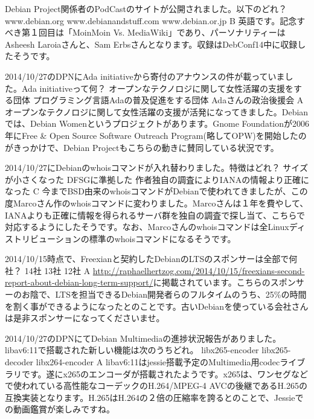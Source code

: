 %

\santaku
{Debian Project関係者のPodCastのサイトが公開されました。以下のどれ？}
{www.debian.org}
{www.debianandstuff.com}
{www.debian.or.jp}
{B}
{英語です。記念すべき第１回目は「MoinMoin Vs. MediaWiki」であり、パーソナリティーはAsheesh Laroiaさんと、Sam Erbsさんとなります。収録はDebConf14中に収録したそうです。}

\santaku
{2014/10/27のDPNにAda initiativeから寄付のアナウンスの件が載っていました。Ada initiativeって何？}
{オープンなテクノロジに関して女性活躍の支援をする団体}
{プログラミング言語Adaの普及促進をする団体}
{Adaさんの政治後援会}
{A}
{オープンなテクノロジに関して女性活躍の支援が活発になってきました。Debianでは、Debian Womenというプロジェクトがあります。Gnome Foundationが2006年にFree \& Open Source Software Outreach Program(略してOPW)を開始したのがきっかけで、Debian Projectもこちらの動きに賛同している状況です。}

\santaku
{2014/10/27にDebianのwhoisコマンドが入れ替わりました。特徴はどれ？}
{サイズが小さくなった}
{DFSGに準拠した}
{作者独自の調査によりIANAの情報より正確になった}
{C}
{今までBSD由来のwhoisコマンドがDebianで使われてきましたが、この度Marcoさん作のwhoisコマンドに変わりました。Marcoさんは１年を費やして、IANAよりも正確に情報を得られるサーバ群を独自の調査で探し当て、こちらで対応するようにしたそうです。なお、Marcoさんのwhoisコマンドは全Linuxディストリビューションの標準のwhoisコマンドになるそうです。}

\santaku
{2014/10/15時点で、Freexianと契約したDebianのLTSのスポンサーは全部で何社？}
{14社}
{13社}
{12社}
{A}
{\url{http://raphaelhertzog.com/2014/10/15/freexians-second-report-about-debian-long-term-support/}に掲載されています。こちらのスポンサーのお陰で、LTSを担当できるDebian開発者らのフルタイムのうち、25\%の時間を割く事ができるようになったとのことです。古いDebianを使っている会社さんは是非スポンサーになってくださいませ。}

\santaku
{2014/10/27のDPNにてDebian Multimediaの進捗状況報告がありました。libav6:11で搭載された新しい機能は次のうちどれ。}
{libx265-encoder}
{libx265-decoder}
{libx264-encoder}
{A}
{libav6:11はjessie搭載予定のMultimedia用codecライブラリです。遂にx265のエンコーダが搭載されたようです。x265は、ワンセグなどで使われている高性能なコーデックのH.264/MPEG-4 AVCの後継であるH.265の互換実装となります。H.265はH.264の２倍の圧縮率を誇るとのことで、Jessieでの動画鑑賞が楽しみですね。}

